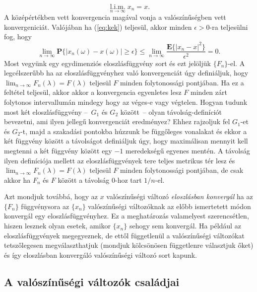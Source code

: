 \documentclass{article}
\begin{document}
\begin{equation}
\underset{n \to \infty}{\operatorname{l.i.m.}} x_{n} = x.
	\label{eq:kek}
\end{equation}
A középértékben vett konvergencia magával vonja a valószínűségben vett konvergeniciát. Valójában ha (\ref{eq:kek}) teljesül, akkor minden $\epsilon > 0$-ra teljesülni fog, hogy 
\begin{equation}
	\lim_{n \to \infty} \mathrm{\textbf{P}}\{|x_{n}(\omega) - x(\omega) | \geq \epsilon \} \leq \lim_{n \to \infty} \frac{\mathrm{\textbf{E}}\{|x_n-x|^2\}}{\epsilon^2} = 0.
\label{eq:kek2}
\end{equation}
Most vegyünk egy egydimenziós eloszlásfüggvény sort és ezt jelöljük $\{F_n\}$-el. A legcélszerűbb ha az eloszlásfüggvényhez való konvergenciát úgy definiáljuk, hogy $\lim_{n \to \infty} F_{n}(\lambda) = F(\lambda)$ teljesül $F$ minden folytonossági pontjában. Ha ez a feltétel teljesül, akkor akkor a konvergencia egyenletes lesz $F$ minden zárt folytonos intervallumán mindegy hogy az véges-e vagy végtelen. Hogyan tudunk most két eloszlásfüggvény --~$G_1$ és $G_2$ között~-- olyan távolság-definíciót bevezetni, ami ilyen jellegű konvergenciát eredményez? Ehhez rajzoljuk fel $G_1$-et és $G_2$-t, majd a szakadási pontokba húzzunk be függőleges vonalakat és ekkor a két függvény között a távolságot definiáljuk úgy, hogy maximálisan mennyit kell megtenni a két függvény között egy $-1$ meredekségű egyenes mentén. A távolság ilyen definíciója mellett az eloszlásfüggvények tere teljes metrikus tér lesz és $\lim_{n \to \infty} F_{n}(\lambda) = F(\lambda)$ teljesül $F$ minden folytonossági pontjában, de csak akkor ha $F_n$ és $F$ között a távolság $0$-hoz tart $1/n$-el.

Azt mondjuk továbbá, hogy az $x$ valószínűségi változó \textit{eloszlásban konvergál} ha az $\{F_n\}$ függvénysora az $\{x_n\}$ valószínűségi változóknak az előbb ismertetett módon konvergál egy eloszlásfüggvényhez. Ez a meghatározás valamelyest szerencsétlen, hiszen lesznek olyan esetek, amikor $\{x_n\}$ sehogy sem konvergál. Ha például az eloszlásfüggvények megegyeznek, de ettől függetlenül a valószínűségi változókat tetszőlegesen megválaszthatjuk (mondjuk kölcsönösen függetlenre választjuk őket) és így eloszlásban konvergáló valószínűségi változó sort kapunk.

\subsection{A valószínűségi változók családjai}
\end{document}
